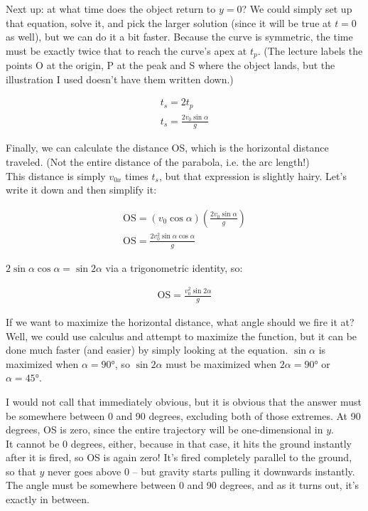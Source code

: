 \documentclass[8.01x]{subfiles}
\begin{document}
Next up: at what time does the object return to $y = 0$? We could simply set up that equation, solve it, and pick the larger solution (since it will be true at $t = 0$ as well), but we can do it a bit faster. Because the curve is symmetric, the time must be exactly twice that to reach the curve's apex at $t_p$. (The lecture labels the points O at the origin, P at the peak and S where the object lands, but the illustration I used doesn't have them written down.)

\begin{align}
t_s = 2 t_p\\
t_s = \frac{2 v_0 \sin \alpha}{g}
\end{align}

Finally, we can calculate the distance OS, which is the horizontal distance traveled. (Not the entire distance of the parabola, i.e. the arc length!)\\
This distance is simply $v_{0x}$ times $t_s$, but that expression is slightly hairy. Let's write it down and then simplify it:

\begin{align}
\text{OS} = (v_0 \cos \alpha) \left(\frac{2 v_0 \sin \alpha}{g} \right)\\
\text{OS} = \frac{2 v_0^2 \sin \alpha \cos \alpha}{g}
\end{align}

$2 \sin \alpha \cos \alpha = \sin 2 \alpha$ via a trigonometric identity, so:

\begin{align}
\text{OS} = \frac{v_0^2 \sin 2\alpha}{g} \label{eq:lec3_os}
\end{align}

If we want to maximize the horizontal distance, what angle should we fire it at? Well, we could use calculus and attempt to maximize the function, but it can be done much faster (and easier) by simply looking at the equation. $\sin \alpha$ is maximized when $\alpha = \ang{90}$, so $\sin 2\alpha$ must be maximized when $2\alpha = \ang{90}$ or $\alpha = \ang{45}$.

I would not call that immediately obvious, but it is obvious that the answer must be somewhere between 0 and 90 degrees, excluding both of those extremes. At 90 degrees, OS is zero, since the entire trajectory will be one-dimensional in $y$.\\
It cannot be 0 degrees, either, because in that case, it hits the ground instantly after it is fired, so OS is again zero! It's fired completely parallel to the ground, so that $y$ never goes above 0 -- but gravity starts pulling it downwards instantly.\\
The angle must be somewhere between 0 and 90 degrees, and as it turns out, it's exactly in between.
\end{document}
